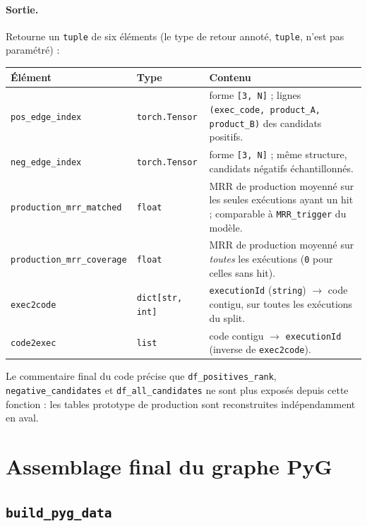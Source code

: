 \documentclass[11pt,a4paper]{article}
\newcommand{\code}[1]{\texttt{\small #1}}
\begin{document}
\paragraph{Sortie.}
Retourne un \code{tuple} de six éléments (le type de retour annoté,
\code{tuple}, n'est pas paramétré) :
\begin{center}
\small
\begin{tabular}{@{}llp{7.4cm}@{}}
\toprule
\textbf{Élément} & \textbf{Type} & \textbf{Contenu} \\
\midrule
\code{pos\_edge\_index} & \code{torch.Tensor} & forme \code{[3, N]} ;
  lignes \code{(exec\_code, product\_A, product\_B)} des candidats positifs. \\
\code{neg\_edge\_index} & \code{torch.Tensor} & forme \code{[3, N]} ; même
  structure, candidats négatifs échantillonnés. \\
\code{production\_mrr\_matched} & \code{float} & MRR de production moyenné sur
  les seules exécutions ayant un hit ; comparable à \code{MRR\_trigger} du
  modèle. \\
\code{production\_mrr\_coverage} & \code{float} & MRR de production moyenné
  sur \emph{toutes} les exécutions (\code{0} pour celles sans hit). \\
\code{exec2code} & \code{dict[str, int]} & \code{executionId} (\code{string})
  $\to$ code contigu, sur toutes les exécutions du split. \\
\code{code2exec} & \code{list} & code contigu $\to$ \code{executionId}
  (inverse de \code{exec2code}). \\
\bottomrule
\end{tabular}
\end{center}
Le commentaire final du code précise que \code{df\_positives\_rank},
\code{negative\_candidates} et \code{df\_all\_candidates} ne sont plus exposés
depuis cette fonction : les tables prototype de production sont reconstruites
indépendamment en aval.

\section{Assemblage final du graphe PyG}

\subsection{\texttt{build\_pyg\_data}}
\label{subsec:fn-build-pyg-data}
\end{document}

